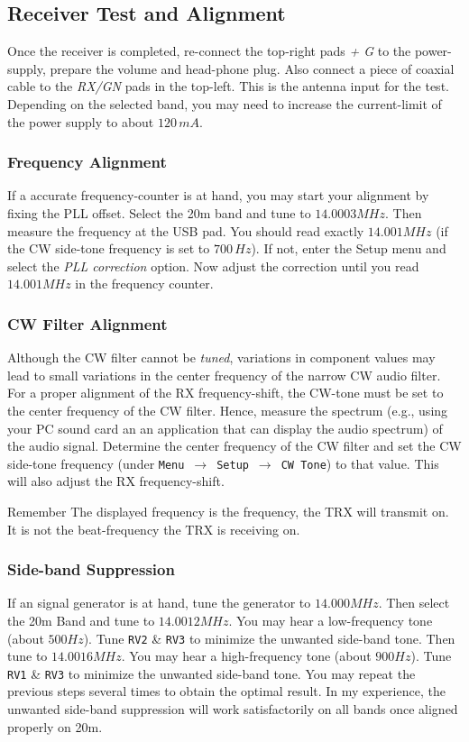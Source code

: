 \documentclass[10pt, a4paper,twoside]{scrartcl}
\newenvironment{remember}{\begin{bclogo}[couleur=blue!30,arrondi=.1,logo=\bccrayon,ombre=true]{Remember}}{\end{bclogo}}
\begin{document}
\subsection{Receiver Test and Alignment}
Once the receiver is completed, re-connect the top-right pads \emph{+ G} to the power-supply, prepare the volume and head-phone plug. Also connect a piece of coaxial cable to the \emph{RX/GN} pads in the top-left. This is the antenna input for the test. Depending on the selected band, you may need to increase the current-limit of the power supply to about $120\,mA$. 

\subsubsection{Frequency Alignment}
If a accurate frequency-counter is at hand, you may start your alignment by fixing the PLL offset. Select the 20m band and tune to $14.0003 MHz$. Then measure the frequency at the USB pad. You should read exactly $14.001 MHz$ (if the CW side-tone frequency is set to $700\,Hz$). If not, enter the Setup menu and select the \emph{PLL correction} option. Now adjust the correction until you read $14.001 MHz$ in the frequency counter.

\subsubsection{CW Filter Alignment}
Although the CW filter cannot be \emph{tuned}, variations in component values may lead to small variations in the center frequency of the narrow CW audio filter. For a proper alignment of the RX frequency-shift, the CW-tone must be set to the center frequency of the CW filter. Hence, measure the spectrum (e.g., using your PC sound card an an application that can display the audio spectrum) of the audio signal. Determine the center frequency of the CW filter and set the CW side-tone frequency (under \texttt{Menu}\ $\rightarrow$\ \texttt{Setup}\ $\rightarrow$\ \texttt{CW Tone}) to that value. This will also adjust the RX frequency-shift.

\begin{remember}
The displayed frequency is the frequency, the TRX will transmit on. It is not the beat-frequency the TRX is receiving on.
\end{remember}

\subsubsection{Side-band Suppression}
If an signal generator is at hand, tune the generator to $14.000 MHz$. Then select the 20m Band and tune to $14.0012 MHz$. You may hear a low-frequency tone (about $500Hz$). Tune \texttt{RV2} \& \texttt{RV3} to minimize the unwanted side-band tone. Then tune to $14.0016 MHz$. You may hear a high-frequency tone (about $900 Hz$). Tune \texttt{RV1} \& \texttt{RV3} to minimize the unwanted side-band tone. You may repeat the previous steps several times to obtain the optimal result. In my experience, the unwanted side-band suppression will work satisfactorily on all bands once aligned properly on 20m. 
\end{document}
